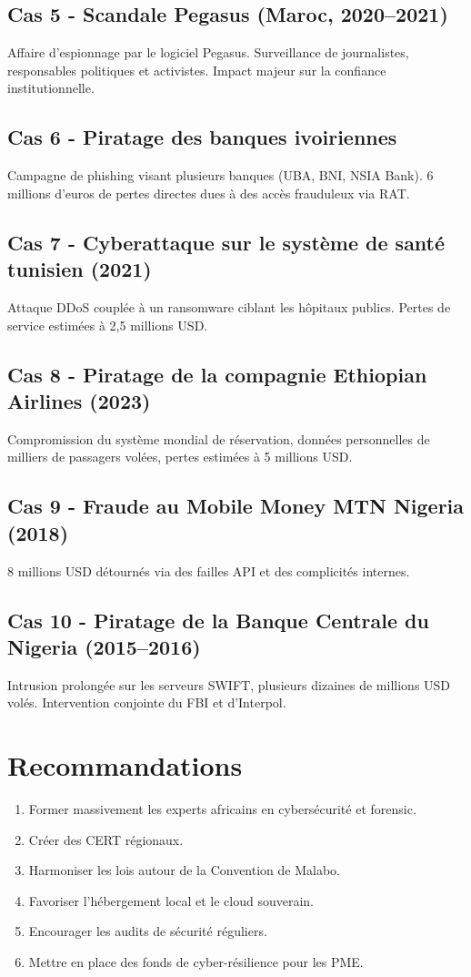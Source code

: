 \documentclass[12pt,a4paper]{article}
\begin{document}
\subsection*{Cas 5 - Scandale Pegasus (Maroc, 2020–2021)}
Affaire d’espionnage par le logiciel Pegasus. Surveillance de journalistes, responsables politiques et activistes. Impact majeur sur la confiance institutionnelle.

\subsection*{Cas 6 - Piratage des banques ivoiriennes}
Campagne de phishing visant plusieurs banques (UBA, BNI, NSIA Bank). 6 millions d’euros de pertes directes dues à des accès frauduleux via RAT.

\subsection*{Cas 7 - Cyberattaque sur le système de santé tunisien (2021)}
Attaque DDoS couplée à un ransomware ciblant les hôpitaux publics. Pertes de service estimées à 2,5 millions USD.

\subsection*{Cas 8 - Piratage de la compagnie Ethiopian Airlines (2023)}
Compromission du système mondial de réservation, données personnelles de milliers de passagers volées, pertes estimées à 5 millions USD.

\subsection*{Cas 9 - Fraude au Mobile Money MTN Nigeria (2018)}
8 millions USD détournés via des failles API et des complicités internes.

\subsection*{Cas 10 - Piratage de la Banque Centrale du Nigeria (2015–2016)}
Intrusion prolongée sur les serveurs SWIFT, plusieurs dizaines de millions USD volés. Intervention conjointe du FBI et d’Interpol.

\section{Recommandations}
\begin{enumerate}
    \item Former massivement les experts africains en cybersécurité et forensic.
    \item Créer des CERT régionaux.
    \item Harmoniser les lois autour de la Convention de Malabo.
    \item Favoriser l’hébergement local et le cloud souverain.
    \item Encourager les audits de sécurité réguliers.
    \item Mettre en place des fonds de cyber-résilience pour les PME.
\end{enumerate}
\end{document}
